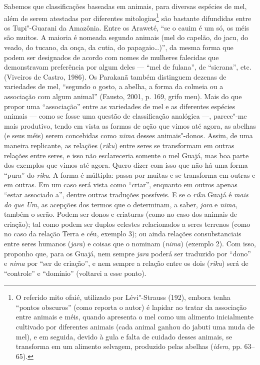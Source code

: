 Sabemos que classificações baseadas em animais, para diversas espécies
de mel, além de serem atestadas por diferentes mitologias\footnote{O
  referido mito ofaié, utilizado por Lévi"-Strauss (192), embora tenha
  ``pontos obscuros'' (como reporta o autor) é lapidar ao tratar da
  associação entre animais e méis, quando apresenta o mel como um
  alimento inicialmente cultivado por diferentes animais (cada animal
  ganhou do jabuti uma muda de mel), e em seguida, devido à gula e falta
  de cuidado desses animais, se transforma em um alimento selvagem,
  produzido pelas abelhas (\emph{idem}, pp. 63--65).} são bastante difundidas entre
os Tupi"-Guarani da Amazônia. Entre os Araweté, ``se o cauim é um só, os
méis são muitos. A maioria é nomeada segundo animais (mel do capelão, do
jacu, do veado, do tucano, da onça, da cutia, do papagaio\ldots{})'', da mesma
forma que podem ser designados de acordo com nomes de mulheres falecidas
que demonstravam preferência por algum deles --- ``mel de fulana'', de
``sicrana'', etc. (Viveiros de Castro, 1986). Os Parakanã também
distinguem dezenas de variedades de mel, ``segundo o gosto, a abelha, a
forma da colmeia ou a associação com algum animal'' (Fausto, 2001, p.
169, grifo meu). Mais do que propor uma ``associação'' entre as variedades
de mel e as diferentes espécies animais --- como se fosse uma questão de
classificação analógica ---, parece"-me mais produtivo, tendo em vista as
formas de ação que vimos até agora, as abelhas (e seus méis) serem
concebidas como \emph{nima} desses animais"-donos. Assim, de uma maneira
replicante, as relações (\emph{riku}) entre seres se transformam em
outras relações entre seres, e isso não esclareceria somente o mel
Guajá, mas boa parte dos exemplos que vimos até agora. Quero dizer com
isso que não há uma forma ``pura'' do \emph{riku}. A forma é múltipla:
passa por muitas e se transforma em outras e em outras. Em um caso será
vista como ``criar'', enquanto em outros apenas ``estar associado a'',
dentre outras traduções possíveis. E se o \emph{riku} Guajá é \emph{mais
do que} \emph{Um}, as acepções dos termos que o determinam, a saber,
\emph{jara} e \emph{nima}, também o serão. Podem ser donos e criaturas
(como no caso dos animais de criação); tal como podem ser duplos
celestes relacionados a seres terrenos (como no caso da relação Terra e
céu, exemplo 3); ou ainda relações consubstanciais entre seres humanos
(\emph{jara}) e coisas que o nominam (\emph{nima}) (exemplo 2). Com
isso, proponho que, para os Guajá, nem sempre \emph{jara} poderá ser
traduzido por ``dono'' e \emph{nima} por ``ser de criação'', e nem sempre a
relação entre os dois (\emph{riku}) será de ``controle'' e ``domínio''
(voltarei a esse ponto).

